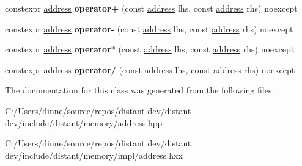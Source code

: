 \begin{DoxyCompactItemize}
\item 
\mbox{\label{classdistant_1_1memory_1_1address_a04953593dea9d095e38a4f515aef7d58}} 
constexpr \mbox{\hyperlink{classdistant_1_1memory_1_1address}{address}} {\bfseries operator+} (const \mbox{\hyperlink{classdistant_1_1memory_1_1address}{address}} lhs, const \mbox{\hyperlink{classdistant_1_1memory_1_1address}{address}} rhs) noexcept
\item 
\mbox{\label{classdistant_1_1memory_1_1address_ab7b9a651b5cf91cdc4faad61e42752c2}} 
constexpr \mbox{\hyperlink{classdistant_1_1memory_1_1address}{address}} {\bfseries operator-\/} (const \mbox{\hyperlink{classdistant_1_1memory_1_1address}{address}} lhs, const \mbox{\hyperlink{classdistant_1_1memory_1_1address}{address}} rhs) noexcept
\item 
\mbox{\label{classdistant_1_1memory_1_1address_a4e614d2c07d4570fb6e96e6d0d1399c9}} 
constexpr \mbox{\hyperlink{classdistant_1_1memory_1_1address}{address}} {\bfseries operator$\ast$} (const \mbox{\hyperlink{classdistant_1_1memory_1_1address}{address}} lhs, const \mbox{\hyperlink{classdistant_1_1memory_1_1address}{address}} rhs) noexcept
\item 
\mbox{\label{classdistant_1_1memory_1_1address_adfaca89e0f2970dc529f38052fb4db79}} 
constexpr \mbox{\hyperlink{classdistant_1_1memory_1_1address}{address}} {\bfseries operator/} (const \mbox{\hyperlink{classdistant_1_1memory_1_1address}{address}} lhs, const \mbox{\hyperlink{classdistant_1_1memory_1_1address}{address}} rhs) noexcept
\end{DoxyCompactItemize}


The documentation for this class was generated from the following files\+:\begin{DoxyCompactItemize}
\item 
C\+:/\+Users/dinne/source/repos/distant dev/distant dev/include/distant/memory/address.\+hpp\item 
C\+:/\+Users/dinne/source/repos/distant dev/distant dev/include/distant/memory/impl/address.\+hxx\end{DoxyCompactItemize}
